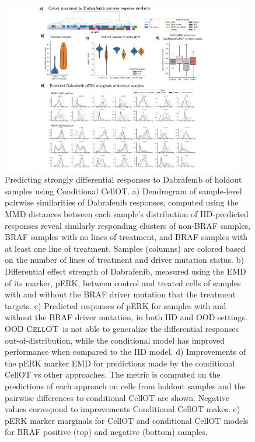 \begin{figure}
  \begin{center}
    \includegraphics[width=0.95\textwidth]{figures/cellot-cohort/condot.pdf}
  \end{center}
  \caption{
    Predicting strongly differential responses to Dabrafenib of holdout samples using Conditional CellOT.
    a) Dendrogram of sample-level pairwise similarities of Dabrafenib responses, computed using the MMD distances between each sample's distribution of IID-predicted responses reveal similarly responding clusters of non-BRAF samples, BRAF samples with no lines of treatment, and BRAF samples with at least one line of treatment.
    Samples (columns) are colored based on the number of lines of treatment and driver mutation status.
    b) Differential effect strength of Dabrafenib, measured using the EMD of its marker, pERK, between control and treated cells of samples with and without the BRAF driver mutation that the treatment targets.
    c) Predicted responses of pERK for samples with and without the BRAF driver mutation, in both IID and OOD settings.
    OOD $\textsc{CellOT}$ is not able to generalize the differential responses out-of-distribution, while the conditional model has improved performance when compared to the IID model.
    d) Improvements of the pERK marker EMD for predictions made by the conditional CellOT vs other approaches. The metric is computed on the predictions of each approach on cells from holdout samples and the pairwise differences to conditional CellOT are shown. Negative values correspond to improvements Conditional CellOT makes. 
    e) pERK marker marginals for CellOT and conditional CellOT models for BRAF positive (top) and negative (bottom) samples.
  }\label{fig:conditional-ot}
\end{figure}


